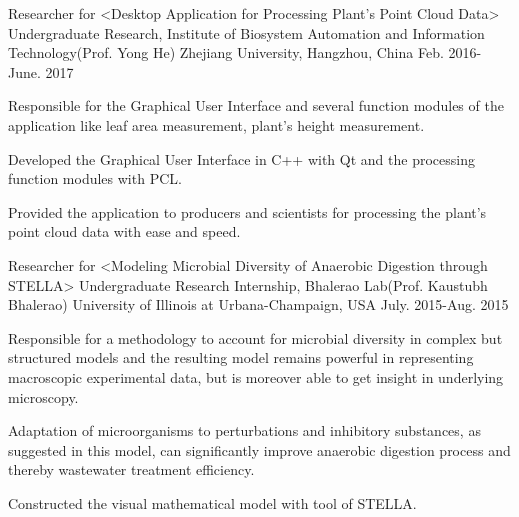 \begin{cventries}

\cventry
{Researcher for <Desktop Application for Processing Plant’s Point Cloud Data>} %
{Undergraduate Research, Institute of Biosystem Automation and Information Technology(Prof. Yong He)} %
{Zhejiang University, Hangzhou, China} %
{Feb. 2016- June. 2017} %
{ %
\begin{cvitems}
\item {Responsible for the Graphical User Interface and several function modules of the application like leaf area measurement, plant’s height measurement.}
\item {Developed the Graphical User Interface in C++ with Qt and the processing function modules with PCL.}
\item {Provided the application to producers and scientists for processing the plant’s point cloud data with ease and speed.}
\end{cvitems} 
}


\cventry
{Researcher for <Modeling Microbial Diversity of Anaerobic Digestion through STELLA>} %
{Undergraduate Research Internship, Bhalerao Lab(Prof. Kaustubh Bhalerao)} %
{University of Illinois at Urbana-Champaign, USA} %
{July. 2015-Aug. 2015} %
{ %
\begin{cvitems}
\item {Responsible for a methodology to account for microbial diversity in complex but structured models and the resulting model remains powerful in representing macroscopic experimental data, but is moreover able to get insight in underlying microscopy.}
\item {Adaptation of microorganisms to perturbations and inhibitory substances, as suggested in this model, can significantly improve anaerobic digestion process and thereby wastewater treatment efficiency.}
\item {Constructed the visual mathematical model with tool of STELLA.}
\end{cvitems}
}


\end{cventries}